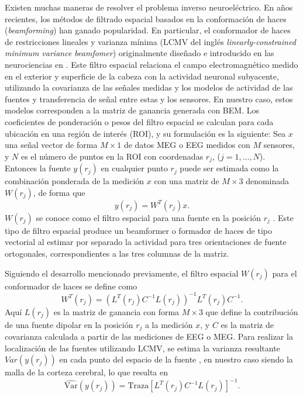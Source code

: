 Existen muchas maneras de resolver el problema inverso neuroeléctrico. En años recientes, los métodos de filtrado espacial basados en la conformación de haces (\emph{beamforming}) han ganado popularidad. 
En particular, el conformador de haces de restricciones lineales y varianza mínima (LCMV del inglés \emph{linearly-constrained minimum variance beamfomer}) originalmente diseñado e introducido en las neurociencias en \cite{VanVeen1988, VanVeen1997}. 
Este filtro espacial relaciona el campo electromagnético medido en el exterior y superficie de la cabeza con la actividad neuronal subyacente, utilizando la covarianza de las señales medidas y los modelos de actividad de las fuentes y transferencia de señal entre estas y los sensores. En nuestro caso, estos modelos corresponden a la matriz de ganancia generada con BEM. 
Los coeficientes de ponderación o pesos del filtro espacial se calculan para cada ubicación en una región de interés (ROI), y su formulación es la siguiente: Sea $x$ una señal vector de forma $M \times 1$ de datos MEG o EEG medidos con $M$ sensores, y $N$ es el número de puntos en la ROI con coordenadas $r_j$, ($j = 1, ..., N$). 
Entonces la fuente $y(r_j)$ en cualquier punto $r_j$ puede ser estimada como la combinación ponderada de la medición $x$ con una matriz de $M \times 3$ denominada $W(r_j)$, de forma que
\begin{equation}
	\label{beamformer}
	y(r_j) = W^{T}(r_j)x \text{.}
\end{equation}
$W(r_j)$ se conoce como el filtro espacial para una fuente en la posición $r_j$ \cite{VanVeen1997,Jaiswal2020}. 
Este tipo de filtro espacial produce un beamformer o formador de haces de tipo vectorial al estimar por separado la actividad para tres orientaciones de fuente ortogonales, correspondientes a las tres columnas de la matriz.

Siguiendo el desarrollo mencionado previamente, el filtro espacial $W(r_j)$ para el conformador de haces se define como
\begin{equation}
	\label{beamformer2}
	W^{T}(r_j) = (L^{T}(r_j)C^{-1}L(r_j))^{-1}L^{T}(r_j)C^{-1} \text{.}
\end{equation}
Aquí $L(r_j)$ es la matriz de ganancia con forma $M \times 3$ que define la contribución de una fuente dipolar en la posición $r_j$ a la medición $x$, y $C$ es la matriz de covarianza calculada a partir de las mediciones de EEG o MEG.
Para realizar la localización de las fuentes utilizando LCMV, se estima la varianza resultante $Var(y(r_j))$ en cada punto del espacio de la fuente \cite{VanVeen1997,Jaiswal2020}, en nuestro caso siendo la malla de la corteza cerebral, lo que resulta en
\begin{equation}
	\label{beamformer3}
	\widehat{\text{Var}}(y(r_j)) = \text{Traza}[L^{T}(r_j)C^{-1}L(r_j)]^{-1}.
\end{equation}

